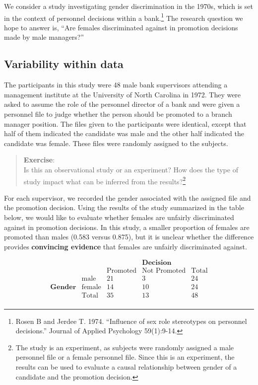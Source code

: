 \documentclass[
  letterpaper,
  DIV=11,
  numbers=noendperiod]{scrreprt}
\begin{document}
We consider a study investigating gender discrimination in the 1970s,
which is set in the context of personnel decisions within a
bank.\footnote{Rosen B and Jerdee T. 1974. ``Influence of sex role
  stereotypes on personnel decisions.'' Journal of Applied Psychology
  59(1):9-14.} The research question we hope to answer is, ``Are females
discriminated against in promotion decisions made by male managers?''

\subsection{Variability within data}\label{variability-within-data}

The participants in this study were 48 male bank supervisors attending a
management institute at the University of North Carolina in 1972. They
were asked to assume the role of the personnel director of a bank and
were given a personnel file to judge whether the person should be
promoted to a branch manager position. The files given to the
participants were identical, except that half of them indicated the
candidate was male and the other half indicated the candidate was
female. These files were randomly assigned to the subjects.

\begin{quote}
\textbf{Exercise}:\\
Is this an observational study or an experiment? How does the type of
study impact what can be inferred from the results?\footnote{The study
  is an experiment, as subjects were randomly assigned a male personnel
  file or a female personnel file. Since this is an experiment, the
  results can be used to evaluate a causal relationship between gender
  of a candidate and the promotion decision.}
\end{quote}

For each supervisor, we recorded the gender associated with the assigned
file and the promotion decision. Using the results of the study
summarized in the table below, we would like to evaluate whether females
are unfairly discriminated against in promotion decisions. In this
study, a smaller proportion of females are promoted than males (0.583
versus 0.875), but it is unclear whether the difference provides
\textbf{convincing evidence} that females are unfairly discriminated
against.

\[
\begin{array}{cc|ccc} & & &\textbf{Decision}\\ 
& & \mbox{Promoted} & \mbox{Not Promoted} & \mbox{Total}  \\
& \hline \mbox{male} & 21 & 3 & 24  \\
\textbf{Gender}& \mbox{female} & 14 & 10 & 24  \\
& \mbox{Total} & 35 & 13 & 48  \\
\end{array} 
\]
\end{document}

